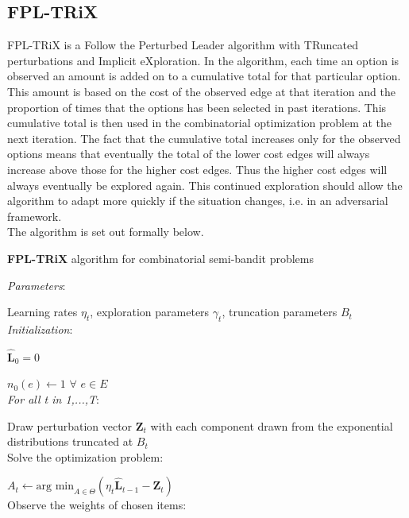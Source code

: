 \subsection{FPL-TRiX}

FPL-TRiX is a Follow the Perturbed Leader algorithm with TRuncated perturbations and Implicit eXploration. In the algorithm, each time an option is observed an amount is added on to a cumulative total for that particular option. This amount is based on the cost of the observed edge at that iteration and the proportion of times that the options has been selected in past iterations. This cumulative total is then used in the combinatorial optimization problem at the next iteration. The fact that the cumulative total increases only for the observed options means that eventually the total of the lower cost edges will always increase above those for the higher cost edges. Thus the higher cost edges will always eventually be explored again. This continued exploration should allow the algorithm to adapt more quickly if the situation changes, i.e. in an adversarial framework.\\

The algorithm is set out formally below.

\noindent \hrulefill

\noindent \textbf{FPL-TRiX} algorithm for combinatorial semi-bandit problems

\noindent \hrulefill

\noindent \textit{Parameters}:

Learning rates $\eta_t$, exploration parameters $\gamma_t$, truncation parameters $B_t$\\

\noindent \textit{Initialization}:

$\mathbf{\hat{L}}_0 = 0$

$n_0(e) \leftarrow 1$ $\forall$ $e \in E$\\

\noindent \textit{For all t in 1,...,T}:

Draw perturbation vector $\mathbf{Z}_t$ with each component drawn from the exponential distributions truncated at $B_t$\\

Solve the optimization problem:

\indent \indent $A_t \leftarrow \textrm{arg min}_{A\in \Theta}(\eta_t\mathbf{\hat{L}}_{t-1}-\mathbf{Z}_t)$\\

Observe the weights of chosen items:

